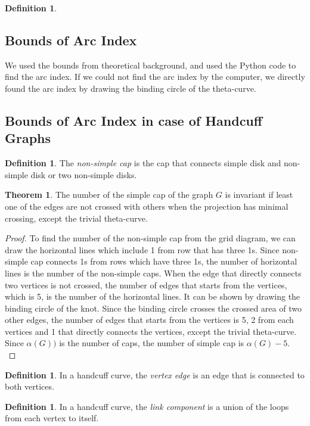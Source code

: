 \documentclass{article}
\theoremstyle{definition}
\newtheorem{defn}[thm]{Definition}
\theoremstyle{theorem}
\newtheorem{theorem}{Theorem}
\theoremstyle{proposition}
\theoremstyle{corollary}
\begin{document}
\begin{defn}
\subsection{Bounds of Arc Index}
We used the bounds from theoretical background, and used the Python code to find the arc index. If we could not find the arc index by the computer, we directly found the arc index by drawing the binding circle of the theta-curve.

\subsection{Bounds of Arc Index in case of Handcuff Graphs}

\begin{defn}
    The \textit{non-simple cap} is the cap that connects simple disk and non-simple disk or two non-simple disks.
\end{defn}

\begin{theorem}
The number of the simple cap of the graph $G$ is invariant if least one of the edges are not crossed with others when the projection has minimal crossing, except the trivial theta-curve.
\end{theorem}
\begin{proof}
     To find the number of the non-simple cap from the grid diagram, we can draw the horizontal lines which include 1 from row that has three 1s. Since non-simple cap connects 1s from rows which have three 1s, the number of horizontal lines is the number of the non-simple caps. When the edge that directly connects two vertices is not crossed, the number of edges that starts from the vertices, which is 5, is the number of the horizontal lines. It can be shown by drawing the binding circle of the knot. Since the binding circle crosses the crossed area of two other edges, the number of edges that starts from the vertices is 5, 2 from each vertices and 1 that directly connects the vertices, except the trivial theta-curve. Since $\alpha(G))$ is the number of caps, the number of simple cap is $\alpha(G) - 5$.\\
\end{proof}

\begin{defn}
    In a handcuff curve, the \textit{vertex edge} is an edge that is connected to both vertices.
\end{defn}

\begin{defn}
    In a handcuff curve, the \textit{link component} is a union of the loops from each vertex to itself.
\end{defn}


\end{defn}
\end{document}
